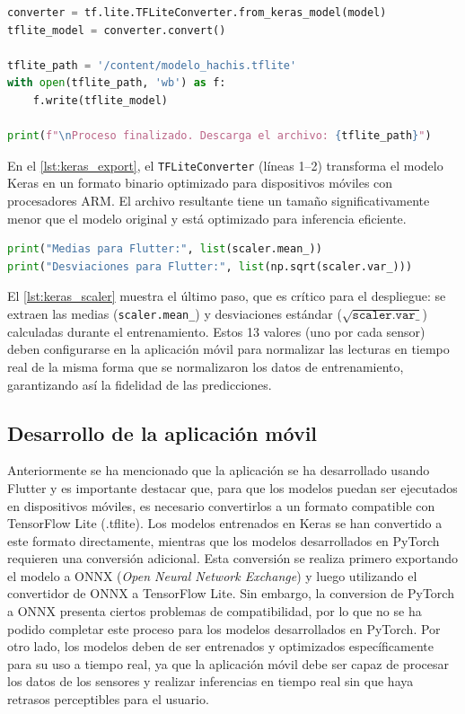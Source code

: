 \begin{lstlisting}[language=Python, caption={Conversión del modelo a TensorFlow Lite.}, label={lst:keras_export}]
converter = tf.lite.TFLiteConverter.from_keras_model(model)
tflite_model = converter.convert()

tflite_path = '/content/modelo_hachis.tflite'
with open(tflite_path, 'wb') as f:
    f.write(tflite_model)

print(f"\nProceso finalizado. Descarga el archivo: {tflite_path}")
\end{lstlisting}

En el \autoref{lst:keras_export}, el \texttt{TFLiteConverter} (líneas 1--2) transforma el modelo Keras en un formato binario optimizado para dispositivos móviles con procesadores ARM\@. El archivo resultante tiene un tamaño significativamente menor que el modelo original y está optimizado para inferencia eficiente.

\begin{lstlisting}[language=Python, caption={Extracción de parámetros de normalización para Flutter.}, label={lst:keras_scaler}]
print("Medias para Flutter:", list(scaler.mean_))
print("Desviaciones para Flutter:", list(np.sqrt(scaler.var_)))
\end{lstlisting}

El \autoref{lst:keras_scaler} muestra el último paso, que es crítico para el despliegue: se extraen las medias (\texttt{scaler.mean\_}) y desviaciones estándar ($\sqrt{\texttt{scaler.var\_}}$) calculadas durante el entrenamiento. Estos 13 valores (uno por cada sensor) deben configurarse en la aplicación móvil para normalizar las lecturas en tiempo real de la misma forma que se normalizaron los datos de entrenamiento, garantizando así la fidelidad de las predicciones.

\subsection{Desarrollo de la aplicación móvil}
Anteriormente se ha mencionado que la aplicación se ha desarrollado usando Flutter y es importante destacar que, para que los modelos puedan ser ejecutados en dispositivos móviles, es necesario convertirlos a un formato compatible con TensorFlow Lite (.tflite). Los modelos entrenados en Keras se han convertido a este formato directamente, mientras que los modelos desarrollados en PyTorch requieren una conversión adicional. Esta conversión se realiza primero exportando el modelo a ONNX (\textit{Open Neural Network Exchange}) y luego utilizando el convertidor de ONNX a TensorFlow Lite. Sin embargo, la conversion de PyTorch a ONNX presenta ciertos problemas de compatibilidad, por lo que no se ha podido completar este proceso para los modelos desarrollados en PyTorch. Por otro lado, los modelos deben de ser entrenados y optimizados específicamente para su uso a tiempo real, ya que la aplicación móvil debe ser capaz de procesar los datos de los sensores y realizar inferencias en tiempo real sin que haya retrasos perceptibles para el usuario.
\par

